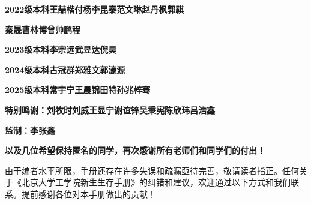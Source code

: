 \documentclass[11pt,oneside]{book}
\begin{document}
\textbf{2022级本科\hspace{20pt}王喆楷\hspace{6pt}付\hspace{11pt}杨\hspace{6pt}李昆泰\hspace{6pt}范文琳\hspace{6pt}赵丹枫\hspace{6pt}郭\hspace{11pt}祺}

\textbf{\hspace{82pt}秦\hspace{11pt}晟\hspace{6pt}曹林博\hspace{6pt}曾帅鹏程}

\textbf{2023级本科\hspace{20pt}李宗远\hspace{6pt}武昱达\hspace{6pt}倪\hspace{11pt}昊}

\textbf{2024级本科\hspace{20pt}古冠群\hspace{6pt}郑雅文\hspace{6pt}郭濠源}

\textbf{2025级本科\hspace{20pt}常宇宁\hspace{6pt}王晨锦\hspace{6pt}田\hspace{11pt}特\hspace{6pt}孙兆梓骞}

\textbf{特别鸣谢：刘牧时\hspace{6pt}刘\hspace{11pt}威\hspace{6pt}王显宁\hspace{6pt}谢谊锋\hspace{6pt}吴秉宪\hspace{6pt}陈欣玮\hspace{6pt}吕浩鑫}

\textbf{监制：李张鑫}

\textbf{以及几位希望保持匿名的同学，再次感谢所有老师们和同学们的付出！}

\vspace{10pt}

由于编者水平所限，手册还存在许多失误和疏漏亟待完善，敬请读者指正。任何关于《北京大学工学院新生生存手册》的纠错和建议，欢迎通过以下方式和我们联系。提前感谢各位对本手册做出的贡献！
\end{document}
